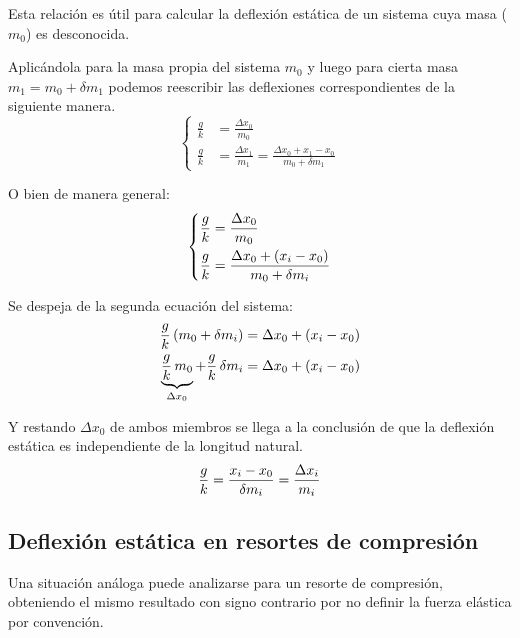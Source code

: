 \documentclass[a5paper,12pt,twoside]{book}
\begin{document}
Esta relación es útil para calcular la deflexión estática de un sistema cuya masa ($m_0$) es desconocida.

Aplicándola para la masa propia del sistema $m_0$ y luego para cierta masa $m_1=m_0 + \delta m_1$ podemos reescribir las deflexiones correspondientes de la siguiente manera.
\begin{equation*}
    \left\{
    \begin{aligned}
        \frac{g}{k} &= \frac{\Delta x_0}{m_0}
        \\
        \frac{g}{k} &= \frac{\Delta x_1}{m_1} = \frac{\Delta x_0 + x_1 - x_0}{m_0 + \delta m_1}
    \end{aligned}
    \right.
\end{equation*}

O bien de manera general:
\begin{equation*}
    \left\{
    \begin{aligned}
        \frac{g}{k} &= \frac{\Delta x_0}{m_0}
        \\
        \frac{g}{k} &= \frac{\Delta x_0 + (x_i - x_0)}{m_0 + \delta m_i}
    \end{aligned}
    \right.
\end{equation*}

Se despeja de la segunda ecuación del sistema:
\begin{align*}
    \frac{g}{k} \left( m_0 + \delta m_i \right) &= \Delta x_0 + (x_i - x_0)
    \\
    \underbrace{\frac{g}{k} \, m_0}_{\Delta x_0} + \frac{g}{k} \, \delta m_i &= \Delta x_0 + (x_i - x_0)
\end{align*}

Y restando $\Delta x_0$ de ambos miembros se llega a la conclusión de que la deflexión estática es independiente de la longitud natural.
\begin{equation*}
    \frac{g}{k} = \frac{x_i-x_0}{\delta m_i} = \frac{\Delta x_i}{m_i}
\end{equation*}


\subsection*{Deflexión estática en resortes de compresión}

Una situación análoga puede analizarse para un resorte de compresión, obteniendo el mismo resultado con signo contrario por no definir la fuerza elástica por convención.

\begin{center}
    \def\svgwidth{0.8\linewidth}
    
\end{center}
\end{document}
